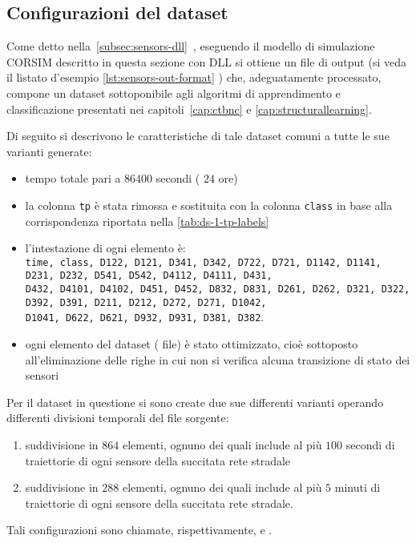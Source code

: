 \newpage
\subsection{Configurazioni del dataset}
Come detto nella~\autoref{subsec:sensors-dll}~, eseguendo il modello di simulazione \acs{CORSIM} descritto in questa sezione con  \acs{DLL} si ottiene un file di output (si veda il listato d'esempio \ref{lst:sensors-out-format} ) che, adeguatamente processato, compone un dataset sottoponibile agli algoritmi di apprendimento e classificazione presentati nei capitoli~\ref{cap:ctbnc} e \ref{cap:structurallearning}.

Di seguito si descrivono le caratteristiche di tale dataset comuni a tutte le sue varianti generate:
\begin{itemize}
	\item tempo totale pari a $86400$ secondi (\ie{} $24$ ore)
	\item la colonna \lstinline[]|tp| è stata rimossa e sostituita con la colonna \lstinline[]|class| in base alla corrispondenza riportata nella \vref{tab:ds-1-tp-labels}
	\item l'intestazione di ogni elemento è: \\ \lstinline[]|time, class, D122, D121, D341, D342, D722, D721, D1142, D1141, D231, D232, D541, D542, D4112, D4111, D431, |\\\lstinline[]|D432, D4101, D4102, D451, D452, D832, D831, D261, D262, D321, D322, D392, D391, D211, D212, D272, D271, D1042, |\\\lstinline[]|D1041, D622, D621, D932, D931, D381, D382|.
	\item ogni elemento del dataset (\ie{} file) è stato ottimizzato, cioè sottoposto all'eliminazione delle righe in cui non si verifica alcuna transizione di stato dei sensori
\end{itemize}

Per il dataset in questione si sono create due sue differenti varianti operando differenti divisioni temporali del file sorgente:
\begin{enumerate}
	\item suddivisione in $864$ elementi, ognuno dei quali include al più $100$ secondi di traiettorie di ogni sensore della succitata rete stradale
	\item suddivisione in $288$ elementi, ognuno dei quali include al più $5$ minuti di traiettorie di ogni sensore della succitata rete stradale.
\end{enumerate}
Tali configurazioni sono chiamate, rispettivamente,  e .

